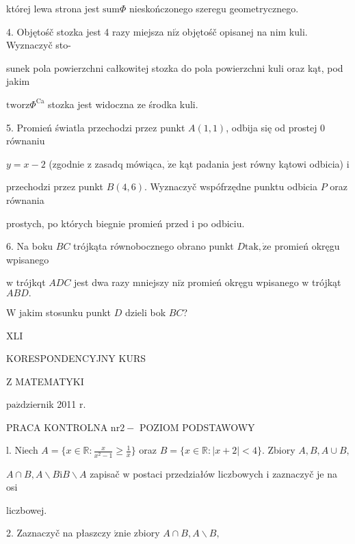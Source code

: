 \documentclass[a4paper,12pt]{article}
\begin{document}
której lewa strona jest $\mathrm{s}\mathrm{u}\mathrm{m}\Phi$ nieskończonego szeregu geometrycznego.

4. Objętośč stozka jest 4 razy miejsza $\mathrm{n}\mathrm{i}\dot{\mathrm{z}}$ objętośč opisanej na nim kuli. Wyznaczyč sto-

sunek pola powierzchni całkowitej stozka do pola powierzchni kuli oraz kąt, pod jakim

$\mathrm{t}\mathrm{w}\mathrm{o}\mathrm{r}\mathrm{z}\Phi^{\mathrm{C}\mathrm{a}}$ stozka jest widoczna ze środka kuli.

5. Promień światla przechodzi przez punkt $A(1,1)$, odbija się od prostej $0$ równaniu

$y = x-2$ (zgodnie $\mathrm{z}$ zasadq mówiąca, $\dot{\mathrm{z}}\mathrm{e}$ kąt padania jest równy kątowi odbicia) $\mathrm{i}$

przechodzi przez punkt $B(4,6)$. Wyznaczyč wspófrzędne punktu odbicia $P$ oraz równania

prostych, po których biegnie promień przed $\mathrm{i}$ po odbiciu.

6. Na boku $BC$ trójkąta równobocznego obrano punkt $D\mathrm{t}\mathrm{a}\mathrm{k}, \dot{\mathrm{z}}\mathrm{e}$ promień okręgu wpisanego

$\mathrm{w}$ trójkqt $ADC$ jest dwa razy mniejszy $\mathrm{n}\mathrm{i}\dot{\mathrm{z}}$ promień okręgu wpisanego $\mathrm{w}$ trójkąt $ABD.$

$\mathrm{W}$ jakim stosunku punkt $D$ dzieli bok $BC$?





XLI

KORESPONDENCYJNY KURS

Z MATEMATYKI

$\mathrm{p}\mathrm{a}\acute{\mathrm{z}}$dziernik 2011 $\mathrm{r}.$

PRACA KONTROLNA $\mathrm{n}\mathrm{r} 2-$ POZIOM PODSTAWOWY

l. Niech $A=\displaystyle \{x\in \mathbb{R}:\frac{x}{x^{2}-1}\geq\frac{1}{x}\}$ oraz $B=\{x\in \mathbb{R}:|x+2|<4\}$. Zbiory $A, B, A\cup B,$

$A\cap B, A\backslash B\mathrm{i}B\backslash A$ zapisač $\mathrm{w}$ postaci przedziałów liczbowych $\mathrm{i}$ zaznaczyč je na osi

liczbowej.

2. Zaznaczyč na płaszczy $\acute{\mathrm{z}}\mathrm{n}\mathrm{i}\mathrm{e}$ zbiory $A\cap B, A\backslash B,$
\end{document}
